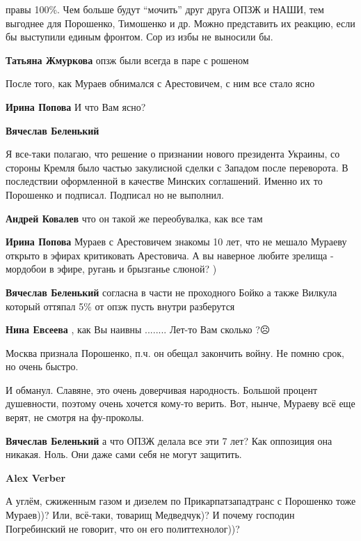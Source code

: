 \begin{itemize}
\begin{itemize}
правы 100\%. Чем больше будут \enquote{мочить} друг друга ОПЗЖ и НАШИ, тем выгоднее для
Порошенко, Тимошенко и др. Можно представить их реакцию, если бы выступили
единым фронтом. Сор из избы не выносили бы.

\textbf{Татьяна Жмуркова} опзж были всегда в паре с рошеном

После того, как Мураев обнимался с Арестовичем, с ним все стало ясно

\textbf{Ирина Попова} И что Вам ясно?

\textbf{Вячеслав Беленький} 

Я все-таки полагаю, что решение о признании нового президента Украины, со
стороны Кремля было частью закулисной сделки с Западом после переворота. В
последствии оформленной в качестве Минских соглашений. Именно их то Порошенко и
подписал. Подписал но не выполнил.


\textbf{Андрей Ковалев} что он такой же переобувалка, как все там

\textbf{Ирина Попова} Мураев с Арестовичем знакомы 10 лет, что не мешало Мураеву открыто в эфирах критиковать Арестовича. А вы наверное любите зрелища - мордобои в эфире, ругань и брызганье слюной? )

\textbf{Вячеслав Беленький} согласна в части не проходного Бойко а также Вилкула который оттяпал 5\% от опзж пусть внутри разберутся

\textbf{Нина Евсеева} , как Вы наивны ........ Лет-то Вам сколько ?☹️


Москва признала Порошенко, п.ч. он обещал закончить войну. Не помню срок, но
очень быстро.

И обманул. Славяне, это очень доверчивая народность. Большой процент
душевности, поэтому очень хочется кому-то верить. Вот, нынче, Мураеву всё еще
верят, не смотря на фу-проколы.

\textbf{Вячеслав Беленький} а что ОПЗЖ делала все эти 7 лет? Как оппозиция она никакая. Ноль. Они даже сами себя не могут защитить.

\textbf{Alex Verber} 

А углём, сжиженным газом и дизелем по Прикарпатзападтранс с Порошенко тоже
Мураев))? Или, всё-таки, товарищ Медведчук)? И почему господин Погребинский не
говорит, что он его политтехнолог))?


\end{itemize}
\end{itemize}
